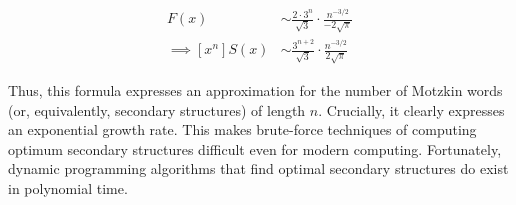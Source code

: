 \documentclass[11pt]{amsart}
\theoremstyle{plain}%
\theoremstyle{definition}
\theoremstyle{remark}
\numberwithin{equation}{thm}
\begin{document}
\begin{align*}
    [x^n]F(x) &\sim \frac{2 \cdot 3^n}{\sqrt{3}} \cdot \frac{n^{-3/2}}{-2\sqrt{\pi}}\\
    \implies [x^n]S(x) &\sim \frac{3^{n+2}}{\sqrt{3}} \cdot \frac{n^{-3/2}}{2\sqrt{\pi}}
\end{align*}

Thus, this formula expresses an approximation for the number of Motzkin words (or, equivalently, secondary structures) of length $n$. Crucially, it clearly expresses an exponential growth rate. This makes brute-force techniques of computing optimum secondary structures difficult even for modern computing. Fortunately, dynamic programming algorithms that find optimal secondary structures do exist in polynomial time.


\end{document}
